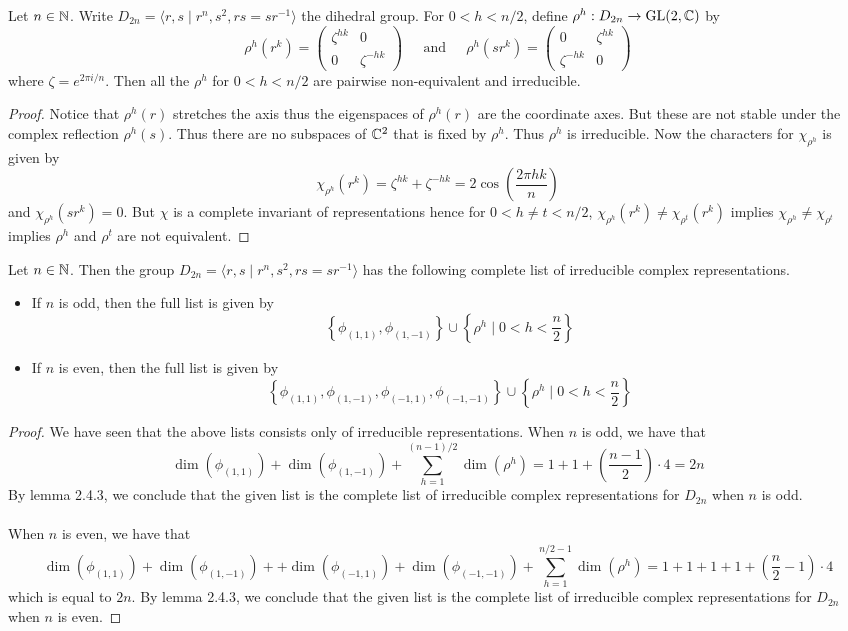 \documentclass[a4paper]{article}
\begin{document}
\begin{prp}{}{} Let $n\in\mathbb{N}$. Write $D_{2n}=\langle r,s\;|\;r^n,s^2,rs=sr^{-1}\rangle$ the dihedral group. For $0<h<n/2$, define $\rho^h:D_{2n}\to\text{GL}(2,\mathbb{C})$ by $$\rho^h(r^k)=\begin{pmatrix}
\zeta^{hk} & 0\\
0 & \zeta^{-hk}
\end{pmatrix}\;\;\;\;\text{ and }\;\;\;\;\rho^h(sr^k)=\begin{pmatrix}
0 & \zeta^{hk}\\
\zeta^{-hk} & 0
\end{pmatrix}$$ where $\zeta=e^{2\pi i/n}$. Then all the $\rho^h$ for $0<h<n/2$ are pairwise non-equivalent and irreducible. \tcbline
\begin{proof}
Notice that $\rho^h(r)$ stretches the axis thus the eigenspaces of $\rho^h(r)$ are the coordinate axes. But these are not stable under the complex reflection $\rho^h(s)$. Thus there are no subspaces of $\mathbb{C}^2$ that is fixed by $\rho^h$. Thus $\rho^h$ is irreducible. Now the characters for $\chi_{\rho^h}$ is given by $$\chi_{\rho^h}(r^k)=\zeta^{hk}+\zeta^{-hk}=2\cos\left(\frac{2\pi hk}{n}\right)$$ and $\chi_{\rho^h}(sr^k)=0$. But $\chi$ is a complete invariant of representations hence for $0<h\neq t<n/2$, $\chi_{\rho^h}(r^k)\neq\chi_{\rho^t}(r^k)$ implies $\chi_{\rho^h}\neq\chi_{\rho^t}$ implies $\rho^h$ and $\rho^t$ are not equivalent. 
\end{proof}
\end{prp}

\begin{thm}{}{} Let $n\in\mathbb{N}$. Then the group $D_{2n}=\langle r,s\;|\;r^n,s^2,rs=sr^{-1}\rangle$ has the following complete list of irreducible complex representations. 
\begin{itemize}
\item If $n$ is odd, then the full list is given by $$\left\{\phi_{(1,1)},\phi_{(1,-1)}\right\}\cup\left\{\rho^h\;|\;0<h<\frac{n}{2}\right\}$$
\item If $n$ is even, then the full list is given by $$\left\{\phi_{(1,1)},\phi_{(1,-1)},\phi_{(-1,1)},\phi_{(-1,-1)}\right\}\cup\left\{\rho^h\;|\;0<h<\frac{n}{2}\right\}$$
\end{itemize} \tcbline
\begin{proof}
We have seen that the above lists consists only of irreducible representations. When $n$ is odd, we have that $$\dim(\phi_{(1,1)})+\dim(\phi_{(1,-1)})+\sum_{h=1}^{(n-1)/2}\dim(\rho^h)=1+1+\left(\frac{n-1}{2}\right)\cdot 4=2n$$ By lemma 2.4.3, we conclude that the given list is the complete list of irreducible complex representations for $D_{2n}$ when $n$ is odd. \\~\\

When $n$ is even, we have that $$\dim(\phi_{(1,1)})+\dim(\phi_{(1,-1)})++\dim(\phi_{(-1,1)})+\dim(\phi_{(-1,-1)})+\sum_{h=1}^{n/2-1}\dim(\rho^h)=1+1+1+1+\left(\frac{n}{2}-1\right)\cdot 4$$ which is equal to $2n$. By lemma 2.4.3, we conclude that the given list is the complete list of irreducible complex representations for $D_{2n}$ when $n$ is even. 
\end{proof}
\end{thm}
\end{document}
